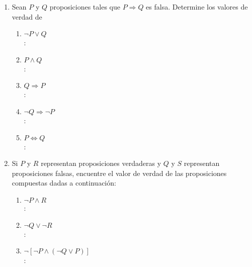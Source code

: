 \begin{enumerate}[label=0.1.\arabic*]
	\item Sean $ P $ y $ Q $ proposiciones tales que $ P \Longrightarrow Q $ es falsa. Determine los valores de verdad de
	\begin{enumerate}[label=(\arabic*)]
		\item $ \neg P \vee Q $ \\
		\solucion: \\
		
		\item $ P \wedge Q $ \\
		\solucion: \\
		
		\item $ Q \Longrightarrow P $ \\
		\solucion: \\
		
		\item $ \neg Q \Longrightarrow \neg P $ \\
		\solucion: \\
		
		\item $ P \Longleftrightarrow Q $ \\
		\solucion: \\
		
	\end{enumerate}

	\item Si $ P $ y $ R $ representan proposiciones verdaderas y $ Q $ y $ S $ representan proposiciones falsas, encuentre el valor de verdad de las proposiciones compuestas dadas a continuación:
	\begin{enumerate}[label=(\arabic*)]
		\item $ \neg P \wedge R $ \\
		\solucion: \\
		
		\item $ \neg Q \vee \neg R $ \\
		\solucion: \\
		
		\item $ \neg [ \neg P \wedge (\neg Q \vee P) ] $ \\
		\solucion: \\
		

\end{enumerate}
\end{enumerate}
